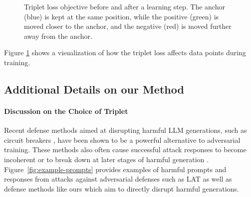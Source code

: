 \documentclass[11pt]{article}
\begin{document}
\begin{figure}[htbp]
\begin{minipage}{0.48\textwidth}
    \end{minipage}

    \caption{Triplet loss objective before and after a learning step. The anchor (blue) is kept at the same position, while the positive (green) is moved closer to the anchor, and the negative (red) is moved further away from the anchor.}
    \label{fig:triplet_loss_3d}
\end{figure}

Figure \ref{fig:triplet_loss_3d} shows a visualization of how the triplet loss affects
data points during training.

\subsection{Additional Details on our Method}
\label{app:details_method}

\paragraph{Discussion on the Choice of Triplet}

Recent defense methods aimed at disrupting harmful LLM generations, such as circuit breakers \citep{zou2024improvingalignmentrobustnesscircuit}, have been shown to be a powerful alternative to adversarial training. These methods also often cause successful attack responses to become incoherent or to break down at later stages of harmful generation \citep{geisler2025reinforceadversarialattackslarge}. Figure~\ref{fig:example-prompts} provides examples of harmful prompts and responses from attacks against adversarial defenses such as LAT \citep{sheshadri2024latentadversarialtrainingimproves} as well as defense methods like ours which aim to directly disrupt harmful generations.
\end{document}
